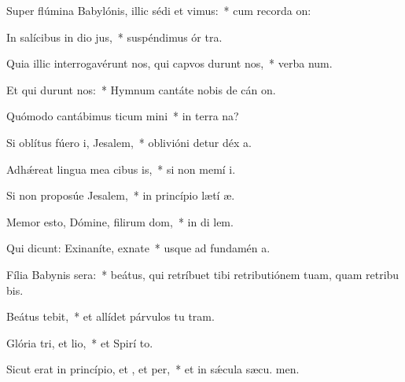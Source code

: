 \item Super flúmina Babylónis, illic sédi et vimus:~* cum recorda on:
\item In salícibus in dio jus,~* suspéndimus ór tra.
\item Quia illic interrogavérunt nos, qui capvos durunt nos,~* verba num.
\item Et qui durunt nos:~* Hymnum cantáte nobis de cán on.
\item Quómodo cantábimus ticum mini~* in terra na?
\item Si oblítus fúero i, Jesalem,~* oblivióni detur déx a.
\item Adhǽreat lingua mea cibus is,~* si non memí i.
\item Si non proposúe Jesalem,~* in princípio lætí æ.
\item Memor esto, Dómine, filirum dom,~* in di lem.
\item Qui dicunt: Exinaníte, exnate~* usque ad fundamén  a.
\item Fília Babynis sera:~* beátus, qui retríbuet tibi retributiónem tuam, quam retribu bis.
\item Beátus  tebit,~* et allídet párvulos tu  tram.
\item Glória tri, et lio,~* et Spirí to.
\item Sicut erat in princípio, et , et per,~* et in sǽcula sæcu. men.
